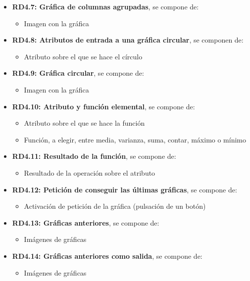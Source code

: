 \begin{itemize}
	\item \textbf{RD4.7: Gráfica de columnas agrupadas}, se compone de:
	\begin{itemize}
		\item Imagen con la gráfica
	\end{itemize}
	
	\item \textbf{RD4.8: Atributos de entrada a una gráfica circular}, se componen de:
	\begin{itemize}
		\item Atributo sobre el que se hace el círculo
	\end{itemize}
	
	\item \textbf{RD4.9: Gráfica circular}, se compone de:
	\begin{itemize}
			\item Imagen con la gráfica
	\end{itemize}
	
	\item \textbf{RD4.10: Atributo y función elemental}, se compone de:
	\begin{itemize}
		\item Atributo sobre el que se hace la función
		\item Función, a elegir, entre media, varianza, suma, contar, máximo o mínimo
	\end{itemize}
	
	\item \textbf{RD4.11: Resultado de la función}, se compone de:
	\begin{itemize}
		\item Resultado de la operación sobre el atributo
	\end{itemize}
	
	\item \textbf{RD4.12: Petición de conseguir las últimas gráficas}, se compone de:
	\begin{itemize}
		\item Activación de petición de la gráfica (pulsación de un botón)
	\end{itemize}
	
	\item \textbf{RD4.13: Gráficas anteriores}, se compone de:
	\begin{itemize}
		\item Imágenes de gráficas
	\end{itemize}
	
	\item \textbf{RD4.14: Gráficas anteriores como salida}, se compone de:
	\begin{itemize}
		\item Imágenes de gráficas
	\end{itemize}
	
	
	
	
	
\end{itemize}
